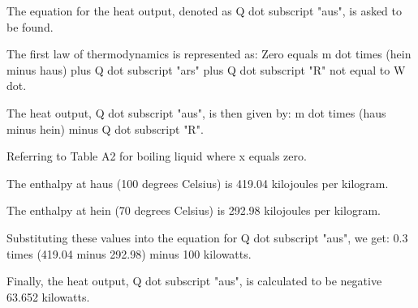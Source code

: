 The equation for the heat output, denoted as Q dot subscript "aus", is asked to be found.

The first law of thermodynamics is represented as:
Zero equals m dot times (hein minus haus) plus Q dot subscript "ars" plus Q dot subscript "R" not equal to W dot.

The heat output, Q dot subscript "aus", is then given by:
m dot times (haus minus hein) minus Q dot subscript "R".

Referring to Table A2 for boiling liquid where x equals zero.

The enthalpy at haus (100 degrees Celsius) is 419.04 kilojoules per kilogram.

The enthalpy at hein (70 degrees Celsius) is 292.98 kilojoules per kilogram.

Substituting these values into the equation for Q dot subscript "aus", we get:
0.3 times (419.04 minus 292.98) minus 100 kilowatts.

Finally, the heat output, Q dot subscript "aus", is calculated to be negative 63.652 kilowatts.